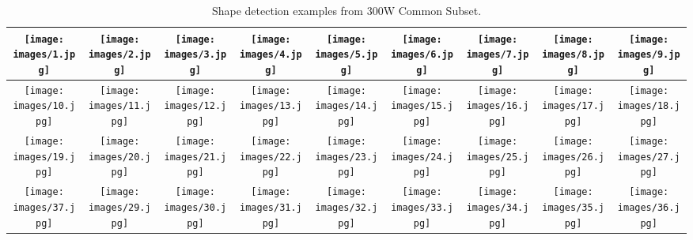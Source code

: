 \documentclass[journal]{IEEEtran}
\begin{document}
\begin{table*}[t]
 \centering \caption{Shape detection examples from 300W Common Subset.}
\begin{tabular}{|c|c|c|c|c|c|c|c|c|}
\hline
\texttt{[image: images/1.jpg]}&
\texttt{[image: images/2.jpg]}&
\texttt{[image: images/3.jpg]} &
\texttt{[image: images/4.jpg]} &
\texttt{[image: images/5.jpg]} &
\texttt{[image: images/6.jpg]}&
\texttt{[image: images/7.jpg]}&
\texttt{[image: images/8.jpg]} &
\texttt{[image: images/9.jpg]} \\
\hline
\texttt{[image: images/10.jpg]}&
\texttt{[image: images/11.jpg]}&
\texttt{[image: images/12.jpg]} &
\texttt{[image: images/13.jpg]} &
\texttt{[image: images/14.jpg]} &
\texttt{[image: images/15.jpg]}&
\texttt{[image: images/16.jpg]}&
\texttt{[image: images/17.jpg]} &
\texttt{[image: images/18.jpg]} \\
\hline
\texttt{[image: images/19.jpg]}&
\texttt{[image: images/20.jpg]}&
\texttt{[image: images/21.jpg]} &
\texttt{[image: images/22.jpg]} &
\texttt{[image: images/23.jpg]} &
\texttt{[image: images/24.jpg]}&
\texttt{[image: images/25.jpg]}&
\texttt{[image: images/26.jpg]} &
\texttt{[image: images/27.jpg]} \\
\hline
\texttt{[image: images/37.jpg]}&
\texttt{[image: images/29.jpg]}&
\texttt{[image: images/30.jpg]} &
\texttt{[image: images/31.jpg]} &
\texttt{[image: images/32.jpg]} &
\texttt{[image: images/33.jpg]}&
\texttt{[image: images/34.jpg]}&
\texttt{[image: images/35.jpg]} &
\texttt{[image: images/36.jpg]} \\
\end{tabular}
 \label{image_examples_common}
\end{table*}
\end{document}
